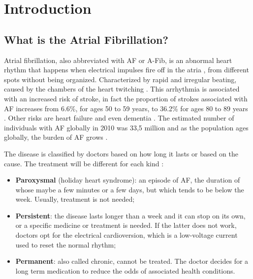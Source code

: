 \chapter{Introduction}
\label{sec:introduction}

\section{What is the Atrial Fibrillation?}
Atrial fibrillation, also abbreviated with AF or A-Fib, is an abnormal heart rhythm that happens when electrical impulses fire off in the atria , from different spots without being organized. Characterized by rapid and irregular beating, caused by the chambers of the heart twitching \cite{cdcgov17}. This arrhythmia is associated with an increased risk of stroke, in fact the proportion of strokes associated with AF increases from 6.6\%, for ages 50 to 59 years, to 36.2\% for ages 80 to 89 years \cite{10.1001/archinte.1987.00370090041008}. Other risks are heart failure and even dementia \cite{Munger2014}. The estimated number of individuals with AF globally in 2010 was 33,5 million and as the population ages globally, the burden of AF grows \cite{doi:10.1161/CIRCULATIONAHA.113.005119}.


The disease is classified by doctors based on how long it lasts or based on the cause. The treatment will be different for each kind \cite{webmd2018}:
\begin{itemize}
  \item \textbf{Paroxysmal} (holiday heart syndrome): an episode of AF, the duration of whose maybe a few minutes or a few days, but which tends to be below the week. Usually, treatment is not needed;
  \item \textbf{Persistent}: the disease lasts longer than a week and it can stop on its own, or a specific medicine or treatment is needed. If the latter does not work, doctors opt for the electrical cardioversion, which is a low-voltage current used to reset the normal rhythm;
  \item \textbf{Permanent}: also called chronic, cannot be treated. The doctor decides for a long term medication to reduce the odds of associated health conditions.
\end{itemize}

